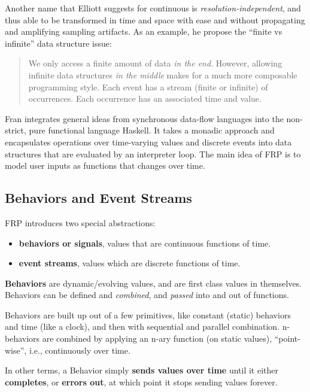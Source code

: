 Another name that Elliott suggests for continuous is
\emph{resolution-independent}, and thus able to be transformed in time
and space with ease and without propagating and amplifying sampling
artifacts. As an example, he propose the ``finite vs infinite'' data
structure issue:

\begin{quote}
We only access a finite amount of data \emph{in the end}. However,
allowing infinite data structures \emph{in the middle} makes for a much
more composable programming style. Each event has a stream (finite or
infinite) of occurrences. Each occurrence has an associated time and
value.
\end{quote}

Fran integrates general ideas from synchronous data-flow languages into
the non-strict, pure functional language Haskell. It takes a monadic
approach and encapsulates operations over time-varying values and
discrete events into data structures that are evaluated by an
interpreter loop. The main idea of FRP is to model user inputs as
functions that changes over time.


\subsection{Behaviors and Event Streams}\label{behaviors-and-event-streams}

FRP introduces two special abstractions:

\begin{itemize}
\itemsep1pt\parskip0pt
\item
  \textbf{behaviors or signals}, values that are continuous functions of
  time.
\item
  \textbf{event streams}, values which are discrete functions of time.
\end{itemize}

\textbf{Behaviors} are dynamic/evolving values, and are first class
values in themselves. Behaviors can be defined and \emph{combined}, and
\emph{passed} into and out of functions.

Behaviors are built up out of a few primitives, like constant (static)
behaviors and time (like a clock), and then with sequential and parallel
combination. n-behaviors are combined by applying an n-ary function (on
static values), ``point-wise'', i.e., continuously over time.

In other terms, a Behavior simply \textbf{sends values over time} until
it either \textbf{completes}, or \textbf{errors out}, at which point it
stops sending values forever.

